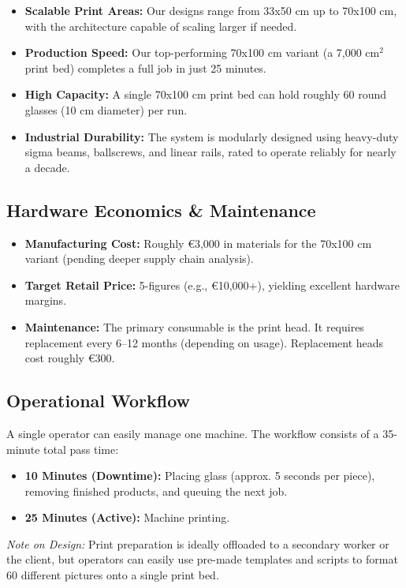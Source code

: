 \documentclass[11pt, a4paper]{article}
\begin{document}
\begin{itemize}
    \item \textbf{Scalable Print Areas:} Our designs range from 33x50 cm up to 70x100 cm, with the architecture capable of scaling larger if needed.
    \item \textbf{Production Speed:} Our top-performing 70x100 cm variant (a 7,000 cm$^2$ print bed) completes a full job in just 25 minutes.
    \item \textbf{High Capacity:} A single 70x100 cm print bed can hold roughly 60 round glasses (10 cm diameter) per run.
    \item \textbf{Industrial Durability:} The system is modularly designed using heavy-duty sigma beams, ballscrews, and linear rails, rated to operate reliably for nearly a decade.
\end{itemize}

\subsection*{Hardware Economics \& Maintenance}
\begin{itemize}
    \item \textbf{Manufacturing Cost:} Roughly €3,000 in materials for the 70x100 cm variant (pending deeper supply chain analysis).
    \item \textbf{Target Retail Price:} 5-figures (e.g., €10,000+), yielding excellent hardware margins.
    \item \textbf{Maintenance:} The primary consumable is the print head. It requires replacement every 6–12 months (depending on usage). Replacement heads cost roughly €300.
\end{itemize}

\subsection*{Operational Workflow}
A single operator can easily manage one machine. The workflow consists of a 35-minute total pass time:

\begin{itemize}
    \item \textbf{10 Minutes (Downtime):} Placing glass (approx. 5 seconds per piece), removing finished products, and queuing the next job.
    \item \textbf{25 Minutes (Active):} Machine printing.
\end{itemize}

\textit{Note on Design:} Print preparation is ideally offloaded to a secondary worker or the client, but operators can easily use pre-made templates and scripts to format 60 different pictures onto a single print bed.
\end{document}
